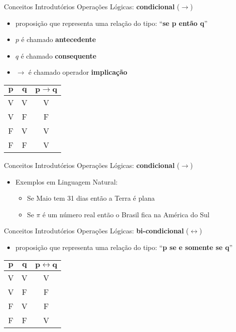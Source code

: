 \begin{frame}[t]{Conceitos Introdutórios} %
	Operações Lógicas: {\bf condicional} ($\rightarrow$)
	\begin{itemize}
	  \item proposição que representa uma relação do tipo: ``{\bf se p então q}''
	  \item $p$ é chamado {\bf antecedente}
	  \item $q$ é chamado {\bf consequente}
	  \item $\rightarrow$ é chamado operador {\bf implicação}
	\end{itemize}

	\begin{center}	
	\begin{tabular}{|c|c|c|}
	\hline
	$\mathbf{p}$ & $\mathbf{q}$ & $\mathbf{p \rightarrow q}$ \\
	\hline
	V & V & V \\
	\hline
	V & F & F \\
	\hline
	F & V & V \\
	\hline
	F & F & V \\
	\hline
	\end{tabular}
	\end{center}
\end{frame}

\begin{frame}[t]{Conceitos Introdutórios} %
	Operações Lógicas: {\bf condicional} ($\rightarrow$)
	\begin{itemize}
	  \item Exemplos em Linguagem Natural:
	  \begin{itemize}
	  \item Se Maio tem 31 dias então a Terra é plana
	  \item Se $\pi$ é um número real então o Brasil fica na América do Sul
	  \end{itemize}
	\end{itemize}
\end{frame}

\begin{frame}[t]{Conceitos Introdutórios} %
	Operações Lógicas: {\bf bi-condicional} ($\leftrightarrow$)
	\begin{itemize}
	  \item proposição que representa uma relação do tipo: ``{\bf p se e somente se q}''
	\end{itemize}

	\begin{center}	
	\begin{tabular}{|c|c|c|}
	\hline
	$\mathbf{p}$ & $\mathbf{q}$ & $\mathbf{p \leftrightarrow q}$ \\
	\hline
	V & V & V \\
	\hline
	V & F & F \\
	\hline
	F & V & F \\
	\hline
	F & F & V \\
	\hline
	\end{tabular}
	\end{center}
\end{frame}

